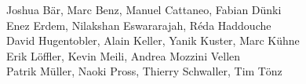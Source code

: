 %
%
%
Joshua Bär,			%
Marc Benz,			%
Manuel Cattaneo,		%
Fabian Dünki%
\\
Enez Erdem,			%
Nilakshan Eswararajah,		%
Réda Haddouche%
\\
David Hugentobler,		%
Alain Keller,			%
Yanik Kuster,			%
Marc Kühne%
\\
Erik Löffler,			%
Kevin Meili,			%
Andrea Mozzini Vellen%
\\
Patrik Müller,			%
Naoki Pross,			%
Thierry Schwaller,		%
Tim Tönz			%

